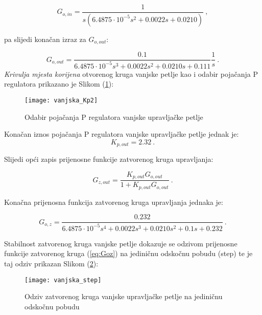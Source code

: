 \documentclass[11pt,a4paper]{article}
\begin{document}
\begin{equation}
G_{o,in} = \frac{1}{s(6.4875\cdot10^{-5}s^{2} + 0.0022s  + 0.0210)} \ ,
\label{eq:Goin}
\end{equation}

pa slijedi konačan izraz za $G_{o,out}$:

\begin{equation}
G_{o,out} = \frac{0.1}{6.4875\cdot10^{-5}s^{3} + 0.0022s^{2}  + 0.0210s + 0.111} \frac{1}{s} \ .
\label{eq:Ginz}
\end{equation}
\medskip
\textit{Krivulja mjesta korijena} otvorenog kruga vanjske petlje kao i odabir pojačanja P regulatora prikazano je Slikom (\ref{fig:vanjska_Kp}):

\begin{figure}[H]
	\centering
	\texttt{[image: vanjska\_Kp2]}
	\caption{Odabir pojačanja P regulatora vanjske upravljačke petlje}
	\label{fig:vanjska_Kp}
\end{figure}

\newpage
Konačan iznos pojačanja P regulatora vanjske upravljačke petlje jednak je:
 \begin{equation}
 \boxed{
 K_{p,out} = 2.32
 } \ .
 \label{eq:Kp_out}
 \end{equation}
 
Slijedi opći zapis prijenosne funkcije zatvorenog kruga upravljanja:

\begin{equation}
G_{z,out} = \frac{K_{p,out}G_{o,out}}{1 + K_{p,out}G_{o,out}} \ .
\label{eq:Goutz}
\end{equation}
 
 Konačna prijenosna funkcija zatvorenog kruga upravljanja jednaka je:
 
 \begin{equation}
 G_{o,z} = \frac{0.232}{6.4875\cdot10^{-5}s^{4} + 0.0022s^{3}  + 0.0210s^{2} + 0.1s + 0.232} \ .
 \label{eq:Goz}
 \end{equation}

Stabilnost zatvorenog kruga vanjske petlje dokazuje se odzivom prijenosne funkcije zatvorenog kruga (\ref{eq:Goz}) na jediničnu odskočnu pobudu (step) te je taj odziv prikazan Slikom (\ref{fig:step2}):

\begin{figure}[H]
	\centering
	\texttt{[image: vanjska\_step]}
	\caption{Odziv zatvorenog kruga vanjske upravljačke petlje na jediničnu odskočnu pobudu}
	\label{fig:step2}
\end{figure}
\end{document}
